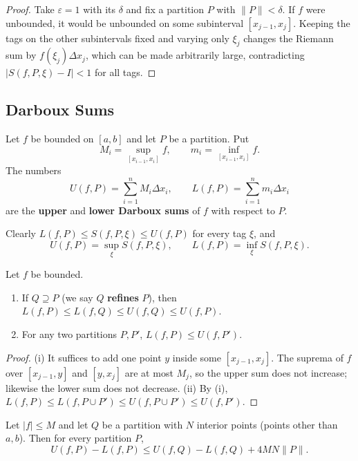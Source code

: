 \documentclass[11pt]{article}
\makeatletter
\newcommand{\envlabel}[1]{\protected@edef\@currentlabel{\themathenv}\label{#1}}
\makeatother
\begin{document}
\begin{proof}
Take $\varepsilon=1$ with its $\delta$ and fix a partition $P$ with $\|P\|<\delta$. If $f$ were unbounded, it would be unbounded on some subinterval $[x_{j-1},x_{j}]$. Keeping the tags on the other subintervals fixed and varying only $\xi_{j}$ changes the Riemann sum by $f(\xi_{j})\Delta x_{j}$, which can be made arbitrarily large, contradicting $|S(f,P,\xi)-I|<1$ for all tags.
\end{proof}

\subsection{Darboux Sums}

\begin{definition}
Let $f$ be bounded on $[a,b]$ and let $P$ be a partition. Put
\[
M_{i}=\sup_{[x_{i-1},x_{i}]}f,\qquad m_{i}=\inf_{[x_{i-1},x_{i}]}f.
\]
The numbers
\[
U(f,P)=\sum_{i=1}^{n}M_{i}\Delta x_{i},\qquad L(f,P)=\sum_{i=1}^{n}m_{i}\Delta x_{i}
\]
are the \textbf{upper} and \textbf{lower Darboux sums} of $f$ with respect to $P$.
\end{definition}

Clearly $L(f,P)\leq S(f,P,\xi)\leq U(f,P)$ for every tag $\xi$, and
\[
U(f,P)=\sup_{\xi}S(f,P,\xi),\qquad L(f,P)=\inf_{\xi}S(f,P,\xi).
\]

\begin{lemma}\envlabel{en:lem:refine}
Let $f$ be bounded.
\begin{enumerate}
  \item If $Q\supseteq P$ (we say $Q$ \textbf{refines} $P$), then $L(f,P)\leq L(f,Q)\leq U(f,Q)\leq U(f,P)$.
  \item For any two partitions $P,P'$, $L(f,P)\leq U(f,P')$.
\end{enumerate}
\end{lemma}

\begin{proof}
(i) It suffices to add one point $y$ inside some $[x_{j-1},x_{j}]$. The suprema of $f$ over $[x_{j-1},y]$ and $[y,x_{j}]$ are at most $M_{j}$, so the upper sum does not increase; likewise the lower sum does not decrease. (ii) By (i), $L(f,P)\leq L(f,P\cup P')\leq U(f,P\cup P')\leq U(f,P')$.
\end{proof}

\begin{lemma}\envlabel{en:lem:mesh}
Let $|f|\leq M$ and let $Q$ be a partition with $N$ interior points (points other than $a,b$). Then for every partition $P$,
\[
U(f,P)-L(f,P)\leq U(f,Q)-L(f,Q)+4MN\|P\|.
\]
\end{lemma}
\end{document}
